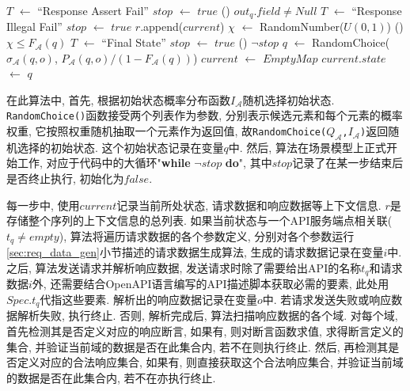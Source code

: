 \begin{algorithm}
{{{{{                                 {
                                	$T$ $\gets$ ``Response Assert Fail''\;
                                    $stop$ $\gets$ $true$\;
                                }
                            }
                            \If() {$out_q.field \neq Null$} {
                            	 {
                                	$T$ $\gets$ ``Response Illegal Fail''\;
                                    $stop$ $\gets$ $true$\;
                                }
                            }
                        }
                    }
                }
                $r$.append($current$)\;
                 {
                	$\chi$ $\gets$ RandomNumber($U(0,1)$)\;
                    \If() {$\chi \le F_{\mathcal{A}}(q)$} {
                    	$T$ $\gets$ ``Final State''\;
                        $stop$ $\gets$ $true$\;
                    }
                }
            	\If() {$\neg stop$} {
                	$q$ $\gets$ RandomChoice($\sigma_{\mathcal{A}}(q,o)$, $P_{\mathcal{A}}(q,o) / \left(1 - F_{\mathcal{A}}(q)\right)$)\;
                    $current$ $\gets$ $EmptyMap$\;
                    $current.state$ $\gets$ $q$\;
                }
            }

            \label{algo:seqgen}
        \end{algorithm}
        
        在此算法中, 首先, 根据初始状态概率分布函数$I_{\mathcal{A}}$随机选择初始状态. \texttt{RandomChoice()}函数接受两个列表作为参数, 分别表示候选元素和每个元素的概率权重, 它按照权重随机抽取一个元素作为返回值, 故\texttt{RandomChoice(}$Q_{\mathcal{A}}$\texttt{,}$I_{\mathcal{A}}$\texttt{)}返回随机选择的初始状态. 这个初始状态记录在变量$q$中. 然后, 算法在场景模型上正式开始工作, 对应于代码中的大循环"\textbf{while} $\neg stop$ \textbf{do}", 其中$stop$记录了在某一步结束后是否终止执行, 初始化为$false$. 
        
        每一步中, 使用$current$记录当前所处状态, 请求数据和响应数据等上下文信息. $r$是存储整个序列的上下文信息的总列表. 如果当前状态与一个API服务端点相关联($t_q \neq empty$), 算法将遍历请求数据的各个参数定义, 分别对各个参数运行\ref{sec:req_data_gen}小节描述的请求数据生成算法, 生成的请求数据记录在变量$i$中. 之后, 算法发送请求并解析响应数据, 发送请求时除了需要给出API的名称$t_q$和请求数据$i$外, 还需要结合OpenAPI语言编写的API描述脚本获取必需的要素, 此处用$Spec.t_q$代指这些要素. 解析出的响应数据记录在变量$o$中. 若请求发送失败或响应数据解析失败, 执行终止. 否则, 解析完成后, 算法扫描响应数据的各个域. 对每个域, 首先检测其是否定义对应的响应断言, 如果有, 则对断言函数求值, 求得断言定义的集合, 并验证当前域的数据是否在此集合内, 若不在则执行终止. 然后, 再检测其是否定义对应的合法响应集合, 如果有, 则直接获取这个合法响应集合, 并验证当前域的数据是否在此集合内, 若不在亦执行终止.
        
